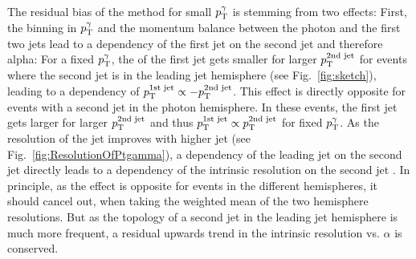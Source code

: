 
The residual bias of the method for small $p_{\text{T}}^{\gamma}$ is stemming from two effects: 
First, the binning in $p_{\text{T}}^{\gamma}$ and the momentum balance between the photon and the first two jets 
lead to a dependency of the first jet \pt on the second jet \pt and therefore alpha: 
For a fixed $p_{\text{T}}^{\gamma}$, 
the \pt of the first jet gets smaller for larger $p_{\text{T}}^{\text{2nd jet}}$ for events where the second jet is in the leading jet hemisphere
(see \mbox{Fig. \ref{fig:sketch}}), leading to a dependency of $p_{\text{T}}^{\text{1st jet}} \propto -p_{\text{T}}^{\text{2nd jet}}$.
This effect is directly opposite for events with a second jet in the photon hemisphere. 
In these events, the first jet \pt gets larger for larger $p_{\text{T}}^{\text{2nd jet}}$ and thus $p_{\text{T}}^{\text{1st jet}} \propto p_{\text{T}}^{\text{2nd jet}}$ for fixed $p_{\text{T}}^{\gamma}$. 
As the resolution of the jet improves with higher jet \pt (see \mbox{Fig. \ref{fig:ResolutionOfPtgamma}}), 
a dependency of the leading jet \pt on the second jet \pt directly leads to a dependency of the intrinsic resolution on the second jet \pt. 
In principle, as the effect is opposite for events in the different hemispheres, it should cancel out, when taking the weighted mean of the two hemisphere resolutions. 
But as the topology of a second jet in the leading jet hemisphere is much more frequent, 
a residual upwards trend in the intrinsic resolution vs. $\alpha$ is conserved. 

